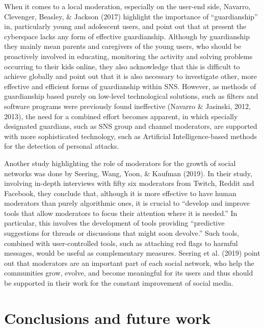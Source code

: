 \documentclass[10pt,dvipsnames]{scrartcl}
\begin{document}
When it comes to a local moderation, especially on the user-end side,
Navarro, Clevenger, Beasley, \& Jackson (2017) highlight the importance
of ``guardianship'' in, particularly young and adolescent users, and
point out that at present the cyberspace lacks any form of effective
guardianship. Although by guardianship they mainly mean parents and
caregivers of the young users, who should be proactively involved in
educating, monitoring the activity and solving problems occurring to
their kids online, they also acknowledge that this is difficult to
achieve globally and point out that it is also necessary to investigate
other, more effective and efficient forms of guardianship within SNS.
However, as methods of guardianship based purely on low-level
technological solutions, such as filters and software programs were
previously found ineffective (Navarro \& Jasinski, 2012, 2013), the need
for a combined effort becomes apparent, in which specially designated
guardians, such as SNS group and channel moderators, are supported with
more sophisticated technology, such as Artificial Intelligence-based
methods for the detection of personal attacks.

Another study highlighting the role of moderators for the growth of
social networks was done by Seering, Wang, Yoon, \& Kaufman (2019). In
their study, involving in-depth interviews with fifty six moderators
from Twitch, Reddit and Facebook, they conclude that, although it is
more effective to have human moderators than purely algorithmic ones, it
is crucial to ``develop and improve tools that allow moderators to focus
their attention where it is needed.'' In particular, this involves the
development of tools providing ``predictive suggestions for threads or
discussions that might soon devolve.'' Such tools, combined with
user-controlled tools, such as attaching red flags to harmful messages,
would be useful as complementary measures. Seering et al. (2019) point
out that moderators are an important part of each social network, who
help the communities grow, evolve, and become meaningful for its users
and thus should be supported in their work for the constant improvement
of social media.

\section{Conclusions and future work}
\label{conclusions}
\end{document}
